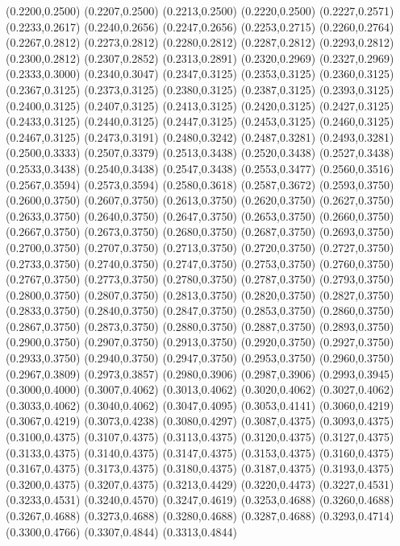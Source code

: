 {(0.2200,0.2500) (0.2207,0.2500) (0.2213,0.2500) (0.2220,0.2500) (0.2227,0.2571) (0.2233,0.2617)
(0.2240,0.2656) (0.2247,0.2656) (0.2253,0.2715) (0.2260,0.2764) (0.2267,0.2812) (0.2273,0.2812)
(0.2280,0.2812) (0.2287,0.2812) (0.2293,0.2812) (0.2300,0.2812) (0.2307,0.2852) (0.2313,0.2891)
(0.2320,0.2969) (0.2327,0.2969) (0.2333,0.3000) (0.2340,0.3047) (0.2347,0.3125) (0.2353,0.3125)
(0.2360,0.3125) (0.2367,0.3125) (0.2373,0.3125) (0.2380,0.3125) (0.2387,0.3125) (0.2393,0.3125)
(0.2400,0.3125) (0.2407,0.3125) (0.2413,0.3125) (0.2420,0.3125) (0.2427,0.3125) (0.2433,0.3125)
(0.2440,0.3125) (0.2447,0.3125) (0.2453,0.3125) (0.2460,0.3125) (0.2467,0.3125) (0.2473,0.3191)
(0.2480,0.3242) (0.2487,0.3281) (0.2493,0.3281) (0.2500,0.3333) (0.2507,0.3379) (0.2513,0.3438)
(0.2520,0.3438) (0.2527,0.3438) (0.2533,0.3438) (0.2540,0.3438) (0.2547,0.3438) (0.2553,0.3477)
(0.2560,0.3516) (0.2567,0.3594) (0.2573,0.3594) (0.2580,0.3618) (0.2587,0.3672) (0.2593,0.3750)
(0.2600,0.3750) (0.2607,0.3750) (0.2613,0.3750) (0.2620,0.3750) (0.2627,0.3750) (0.2633,0.3750)
(0.2640,0.3750) (0.2647,0.3750) (0.2653,0.3750) (0.2660,0.3750) (0.2667,0.3750) (0.2673,0.3750)
(0.2680,0.3750) (0.2687,0.3750) (0.2693,0.3750) (0.2700,0.3750) (0.2707,0.3750) (0.2713,0.3750)
(0.2720,0.3750) (0.2727,0.3750) (0.2733,0.3750) (0.2740,0.3750) (0.2747,0.3750) (0.2753,0.3750)
(0.2760,0.3750) (0.2767,0.3750) (0.2773,0.3750) (0.2780,0.3750) (0.2787,0.3750) (0.2793,0.3750)
(0.2800,0.3750) (0.2807,0.3750) (0.2813,0.3750) (0.2820,0.3750) (0.2827,0.3750) (0.2833,0.3750)
(0.2840,0.3750) (0.2847,0.3750) (0.2853,0.3750) (0.2860,0.3750) (0.2867,0.3750) (0.2873,0.3750)
(0.2880,0.3750) (0.2887,0.3750) (0.2893,0.3750) (0.2900,0.3750) (0.2907,0.3750) (0.2913,0.3750)
(0.2920,0.3750) (0.2927,0.3750) (0.2933,0.3750) (0.2940,0.3750) (0.2947,0.3750) (0.2953,0.3750)
(0.2960,0.3750) (0.2967,0.3809) (0.2973,0.3857) (0.2980,0.3906) (0.2987,0.3906) (0.2993,0.3945)
(0.3000,0.4000) (0.3007,0.4062) (0.3013,0.4062) (0.3020,0.4062) (0.3027,0.4062) (0.3033,0.4062)
(0.3040,0.4062) (0.3047,0.4095) (0.3053,0.4141) (0.3060,0.4219) (0.3067,0.4219) (0.3073,0.4238)
(0.3080,0.4297) (0.3087,0.4375) (0.3093,0.4375) (0.3100,0.4375) (0.3107,0.4375) (0.3113,0.4375)
(0.3120,0.4375) (0.3127,0.4375) (0.3133,0.4375) (0.3140,0.4375) (0.3147,0.4375) (0.3153,0.4375)
(0.3160,0.4375) (0.3167,0.4375) (0.3173,0.4375) (0.3180,0.4375) (0.3187,0.4375) (0.3193,0.4375)
(0.3200,0.4375) (0.3207,0.4375) (0.3213,0.4429) (0.3220,0.4473) (0.3227,0.4531) (0.3233,0.4531)
(0.3240,0.4570) (0.3247,0.4619) (0.3253,0.4688) (0.3260,0.4688) (0.3267,0.4688) (0.3273,0.4688)
(0.3280,0.4688) (0.3287,0.4688) (0.3293,0.4714) (0.3300,0.4766) (0.3307,0.4844) (0.3313,0.4844)
}
